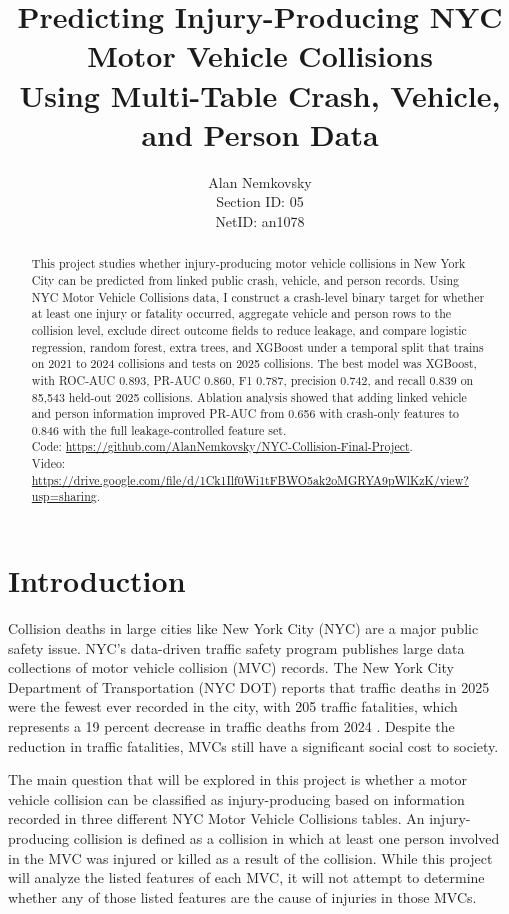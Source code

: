 \documentclass{article}
\title{Predicting Injury-Producing NYC Motor Vehicle Collisions\\Using Multi-Table Crash, Vehicle, and Person Data}
\author{Alan Nemkovsky \\
Section ID: 05 \\
NetID: an1078}
\begin{document}
\maketitle

\begin{abstract}
This project studies whether injury-producing motor vehicle collisions in New York City can be predicted from linked public crash, vehicle, and person records. Using NYC Motor Vehicle Collisions data, I construct a crash-level binary target for whether at least one injury or fatality occurred, aggregate vehicle and person rows to the collision level, exclude direct outcome fields to reduce leakage, and compare logistic regression, random forest, extra trees, and XGBoost under a temporal split that trains on 2021 to 2024 collisions and tests on 2025 collisions. The best model was XGBoost, with ROC-AUC 0.893, PR-AUC 0.860, F1 0.787, precision 0.742, and recall 0.839 on 85,543 held-out 2025 collisions. Ablation analysis showed that adding linked vehicle and person information improved PR-AUC from 0.656 with crash-only features to 0.846 with the full leakage-controlled feature set. 
\\Code: \url{https://github.com/AlanNemkovsky/NYC-Collision-Final-Project}. 
\\Video: \url{https://drive.google.com/file/d/1Ck1Ilf0Wi1tFBWO5ak2oMGRYA9pWlKzK/view?usp=sharing}.
\end{abstract}

\section{Introduction}
Collision deaths in large cities like New York City (NYC) are a major public safety issue. NYC’s data-driven traffic safety program publishes large data collections of motor vehicle collision (MVC) records. The New York City Department of Transportation (NYC DOT) reports that traffic deaths in 2025 were the fewest ever recorded in the city, with 205 traffic fatalities, which represents a 19 percent decrease in traffic deaths from 2024 \citep{nyc_dot_2026}. Despite the reduction in traffic fatalities, MVCs still have a significant social cost to society.

The main question that will be explored in this project is whether a motor vehicle collision can be classified as injury-producing based on information recorded in three different NYC Motor Vehicle Collisions tables. An injury-producing collision is defined as a collision in which at least one person involved in the MVC was injured or killed as a result of the collision. While this project will analyze the listed features of each MVC, it will not attempt to determine whether any of those listed features are the cause of injuries in those MVCs.
\end{document}

